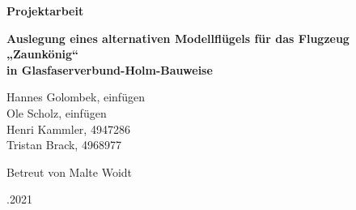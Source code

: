 
\begin{center}
\begin{huge}
	\par\bigskip
	\par\bigskip
	\par\bigskip
	\par\bigskip	
	\par\bigskip
	\par\bigskip	
	\textbf{Projektarbeit}\\
	\par\bigskip
	\par\bigskip	
	\par\bigskip
	\par\bigskip	
	\textbf{Auslegung eines alternativen Modellflügels für das Flugzeug „Zaunkönig“} \\
	\textbf{in Glasfaserverbund-Holm-Bauweise}\\
	\par\bigskip
	\par\bigskip
	
	\end{huge}

	\par\bigskip
\par\bigskip	
\par\bigskip
\par\bigskip
	\par\bigskip
\par\bigskip	
\par\bigskip
\par\bigskip	
	\par\bigskip
\par\bigskip	
\par\bigskip
\par\bigskip	
	Hannes Golombek, einfügen\\
	Ole Scholz, einfügen \\
	Henri Kammler, 4947286\\
	Tristan Brack, 4968977\\
\par\bigskip
\par\bigskip	
\par\bigskip

Betreut von Malte Woidt\\
\par\bigskip
\par\bigskip	
\par\bigskip
\par\bigskip	
\par\bigskip
\par{}.2021\\
\end{center}

